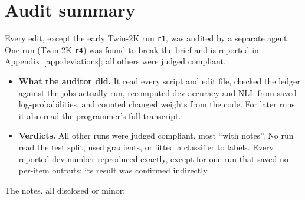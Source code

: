 \section{Audit summary}
\label{app:audits}
Every edit, except the early Twin-2K run \texttt{r1}, was audited by a separate agent. One run (Twin-2K \texttt{r4}) was found to break the brief and is reported in Appendix~\ref{app:deviations}; all others were judged compliant.
\begin{itemize}
  \item \textbf{What the auditor did.} It read every script and edit file, checked the ledger against the jobs actually run, recomputed dev accuracy and NLL from saved log-probabilities, and counted changed weights from the code. For later runs it also read the programmer's full transcript.
  \item \textbf{Verdicts.} All other runs were judged compliant, most ``with notes''. No run read the test split, used gradients, or fitted a classifier to labels. Every reported dev number reproduced exactly, except for one run that saved no per-item outputs; its result was confirmed indirectly.
\end{itemize}
The notes, all disclosed or minor:
